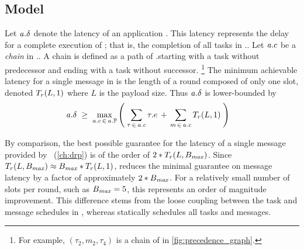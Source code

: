 \subsection{\TTnet Model}
\label{subsec:model}

\squarepar{%
  As discussed in \cref{sec:ttw_implementation}, we implement \TTnet using \baloo, which allows to derive a precise model of
  (i)~the execution time of a communication round and
  (ii)~the time spent with the radio turned on, which correlates with the energy consumed for communication.
  Estimating the communication time is necessary to synthesize the schedules since the scheduler must know how long the rounds last.
  This model should be as tight as possible not to ``waste'' time and thus minimize the end-to-end deadlines schedulable by \TTW, but it must be a safe upper-bound in order to prevent deadline misses.
  This section presents our \TTnet model and derives the theoretically achievable performance in terms of minimal message latency and the energy savings expected from using rounds.%
}

Let $\mathit{a_{}}.\delta$ denote the latency of an application \app. This latency represents the delay for a complete execution of \app; that is, the completion of all tasks in \app.\predG. Let $\mathit{a_{}}.c$ be a \emph{chain} in \app.\predG.
A chain is defined as a path of \app.\predG starting with a task without predecessor and ending with a task without successor.%
%
\footnote{For example, $(\tau_2, m_2, \tau_4)$ is a chain of \predG in \cref{fig:precedence_graph}.}
%
The minimum achievable latency for a single message in \TTW is the length of a round composed of only one slot, denoted $T_{r}(L,1)$ where $L$ is the payload size. Thus $\mathit{a_{}}.\delta$ is lower-bounded by
\begin{align}
\label{eq:min_deadline}
\mathit{a_{}}.\delta \;
	& \geq \; \max_{\mathit{a_{}}.c \,\in\, \mathit{a_{}}.\mathbb{P}}
		\left(
			\; \sum_{\tau \, \in \, \mathit{a_{}}.c} \tau.e \,+\, \sum_{m \, \in \, \mathit{a_{}}.c} T_{r}(L,1) \;
		\right)
\end{align}

\begin{remark}
  By comparison, the best possible guarantee for the latency of a single message provided by  \DRP~(\cref{ch:drp}) is of the order of $2*T_{r}(L,B_{\mathit{max}})$.
  Since $T_{r}(L,B_{\mathit{max}}) \approx B_{\mathit{max}}*T_{r}(L,1)$, \TTW reduces the minimal guarantee on message latency by a factor of approximately $2*B_{\mathit{max}}$.
  For a relatively small number of slots per round, such as $B_{\mathit{max}}=5$, this represents an order of magnitude improvement.
  This difference stems from the loose coupling between the task and message schedules in \DRP, whereas \TTW statically schedules all tasks and messages.
\end{remark}


